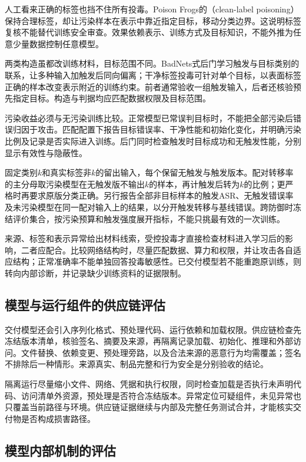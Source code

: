 人工看来正确的标签也挡不住所有投毒。Poison Frogs的（clean-label poisoning）保持合理标签，却让污染样本在表示中靠近指定目标，移动分类边界。这说明标签复核不能替代训练安全审查。效果依赖表示、训练方式及目标知识，不能外推为任意少量数据控制任意模型。

两类构造虽都改训练材料，目标范围不同。BadNets式后门学习触发与目标类别的联系，让多种输入加触发后同向偏离；干净标签投毒可针对单个目标，以表面标签正确的样本改变表示附近的训练约束。前者通常验收一组触发输入，后者还核验预先指定目标。构造与判据均应匹配数据权限及目标范围。

污染收益必须与无污染训练比较。正常模型已常误判目标时，不能把全部污染后错误归因于攻击。匹配配置下报告目标错误率、干净性能和初始化变化，并明确污染比例及记录是否实际进入训练。后门同时检查触发时目标成功和无触发性能，分别显示有效性与隐蔽性。

固定类别$k$和真实标签非$k$的留出输入，每个保留无触发与触发版本。配对转移率的主分母取污染模型在无触发版不输出$k$的样本，再计触发后转为$k$的比例；更严格时再要求原版分类正确。另行报告全部非目标样本的触发ASR、无触发错误率及未污染模型在同一配对输入上的结果，以分开触发转移与基线错误。跨防御时冻结评价集合，按污染预算和触发强度展开指标，不能只挑最有效的一次训练。

来源、标签和表示异常给出材料线索，受控投毒才直接检查材料进入学习后的影响，二者应配合。比较网络结构时，尽量匹配数据、算力和权限，并让攻击各自适应结构；正常准确率不能单独回答投毒敏感性。已交付模型若不能重跑原训练，则转向内部诊断，并记录缺少训练资料的证据限制。

\subsection{模型与运行组件的供应链评估}
\label{sec:security-supply-chain-test}

交付模型还会引入序列化格式、预处理代码、运行依赖和加载权限。供应链检查先冻结版本清单，核验签名、摘要及来源，再隔离记录加载、初始化、推理和外部访问。文件替换、依赖变更、预处理旁路，以及合法来源的恶意行为均需覆盖；签名不排除后一种情形。来源真实、制品完整和行为安全是分别验收的结论。

隔离运行尽量缩小文件、网络、凭据和执行权限，同时检查加载是否执行未声明代码、访问清单外资源，预处理是否符合冻结版本。异常定位可疑组件，未见异常也只覆盖当前路径与环境。供应链证据继续与内部及完整任务测试合并，才能核实交付物是否构成损害路径。

\subsection{模型内部机制的评估}
\label{sec:security-model-test}

